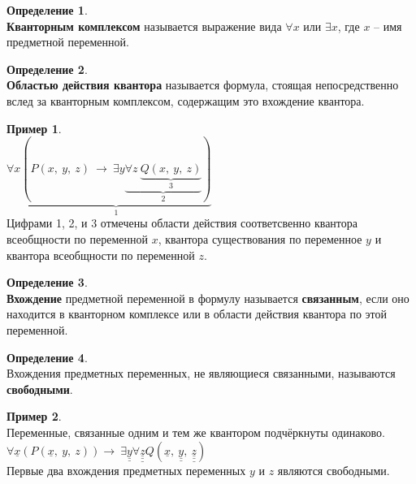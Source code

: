 \documentclass[a4paper,12pt]{article}
\theoremstyle{definition} %
\newtheorem{definition}{Определение}[section]
\newtheorem{example}{Пример}[section]
\theoremstyle{definition} %
\theoremstyle{remark} %
\newcommand{\krs}[1]{\left(#1\right)}
\begin{document}
	\begin{definition} \ \\[1ex]
		\textbf{Кванторным комплексом} называется выражение вида $\forall x$ или $\exists x$, где $x$ -- имя предметной переменной.
	\end{definition}

	\begin{definition} \ \\[1ex]
		\textbf{Областью действия квантора} называется формула, стоящая непосредственно вслед за кванторным комплексом, содержащим это вхождение квантора.
	\end{definition}

	\begin{example} \ \\[1ex]
		$\forall x \underbrace{(P \krs{x, \ y, \ z} \ \rightarrow \ \exists y \underbrace{\forall z \ \underbrace{Q \krs{x, \ y, \ z}}_3}_2 )}_{1}$\\[1ex]
		Цифрами 1, 2, и 3 отмечены области действия соответсвенно квантора всеобщности по переменной $x$, квантора существования по переменное $y$ и квантора всеобщности по переменной $z$.
	\end{example}

	\begin{definition} \ \\[1ex]
		\textbf{Вхождение} предметной переменной в формулу называется \textbf{связанным}, если оно находится в кванторном комплексе или в области действия квантора по этой переменной.
	\end{definition}

	\begin{definition} \ \\[1ex]
		Вхождения предметных переменных, не являющиеся связанными, называются \textbf{свободными}.
	\end{definition}

	\begin{example} \ \\[1ex]
		Переменные, связанные одним и тем же квантором подчёркнуты одинаково.\\[1ex]
		$\forall \underline{x} (P(\underline{x}, \ y, \ z)) \rightarrow \ \exists \underline{\underline{y}} \forall \underline{\underline{\underline{z}}} Q(\underline{x}, \ \underline{\underline{y}}, \ \underline{\underline{\underline{z}}})$\\[1ex]
		Первые два вхождения предметных переменных $y$ и $z$ являются свободными.
	\end{example}
\end{document}
